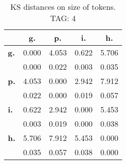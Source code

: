 \begin{table}[h!]
\begin{center}
\begin{tabular}{| l || c | c | c | c |}\hline
 & {\bf g.} & {\bf p.} & {\bf i.} & {\bf h.} \\\hline\hline
{\bf g.} & 0.000 & 4.053 & 0.622 & 5.706 \\
{\bf } & 0.000 & 0.022 & 0.003 & 0.035 \\\hline
{\bf p.} & 4.053 & 0.000 & 2.942 & 7.912 \\
{\bf } & 0.022 & 0.000 & 0.019 & 0.057 \\\hline
{\bf i.} & 0.622 & 2.942 & 0.000 & 5.453 \\
{\bf } & 0.003 & 0.019 & 0.000 & 0.038 \\\hline
{\bf h.} & 5.706 & 7.912 & 5.453 & 0.000 \\
{\bf } & 0.035 & 0.057 & 0.038 & 0.000 \\\hline
\end{tabular}
\caption{KS distances on size of tokens. TAG: 4}
\end{center}
\end{table}